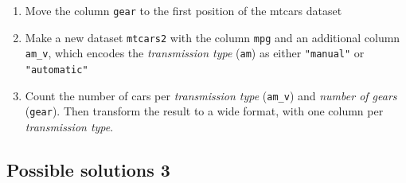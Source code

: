 \documentclass[
  letterpaper,
]{book}
\newenvironment{Shaded}{}{}
\begin{document}
\begin{enumerate}
\def\labelenumi{\arabic{enumi}.}
\item
  Move the column \texttt{gear} to the first position of the mtcars
  dataset

\begin{Shaded}
\begin{Highlighting}[]

\end{Highlighting}
\end{Shaded}
\item
  Make a new dataset \texttt{mtcars2} with the column \texttt{mpg} and
  an additional column \texttt{am\_v}, which encodes the
  \emph{transmission type} (\texttt{am}) as either \texttt{"manual"} or
  \texttt{"automatic"}

\begin{Shaded}
\begin{Highlighting}[]

\end{Highlighting}
\end{Shaded}
\item
  Count the number of cars per \emph{transmission type} (\texttt{am\_v})
  and \emph{number of gears} (\texttt{gear}). Then transform the result
  to a wide format, with one column per \emph{transmission type}.

\begin{Shaded}
\begin{Highlighting}[]

\end{Highlighting}
\end{Shaded}
\end{enumerate}

\hypertarget{possible-solutions-3}{%
\subsection{Possible solutions 3}\label{possible-solutions-3}}
\end{document}
